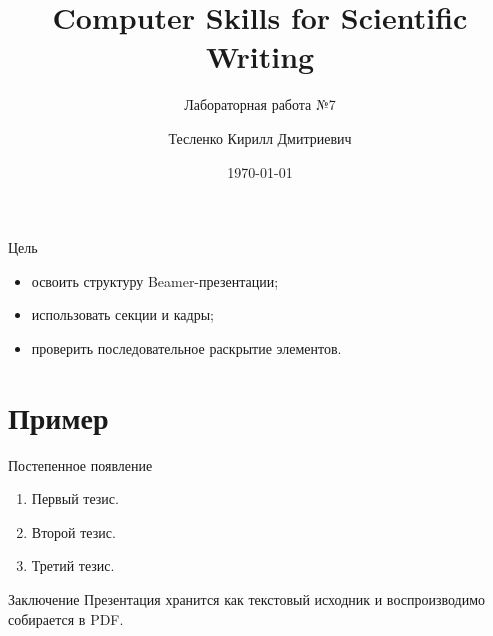 \documentclass[aspectratio=169]{beamer}
\title{Computer Skills for Scientific Writing}
\subtitle{Лабораторная работа №7}
\author{Тесленко Кирилл Дмитриевич}
\date{\today}
\begin{document}
\begin{frame}
  \titlepage
\end{frame}
\begin{frame}{Цель}
  \begin{itemize}
    \item освоить структуру Beamer-презентации;
    \item использовать секции и кадры;
    \item проверить последовательное раскрытие элементов.
  \end{itemize}
\end{frame}
\section{Пример}
\begin{frame}{Постепенное появление}
  \begin{enumerate}[<+->]
    \item Первый тезис.
    \item Второй тезис.
    \item Третий тезис.
  \end{enumerate}
\end{frame}
\begin{frame}{Заключение}
  Презентация хранится как текстовый исходник и воспроизводимо собирается в PDF.
\end{frame}
\end{document}
